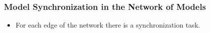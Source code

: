 \documentclass{beamer}
\begin{document}
\begin{frame}[t]
	\frametitle{Model Synchronization in the Network of Models}		\nocite{diskin2011model}
	\begin{itemize}
		\item For each edge of the network there is a synchronization task.
	\end{itemize}
\end{frame}
\end{document}
